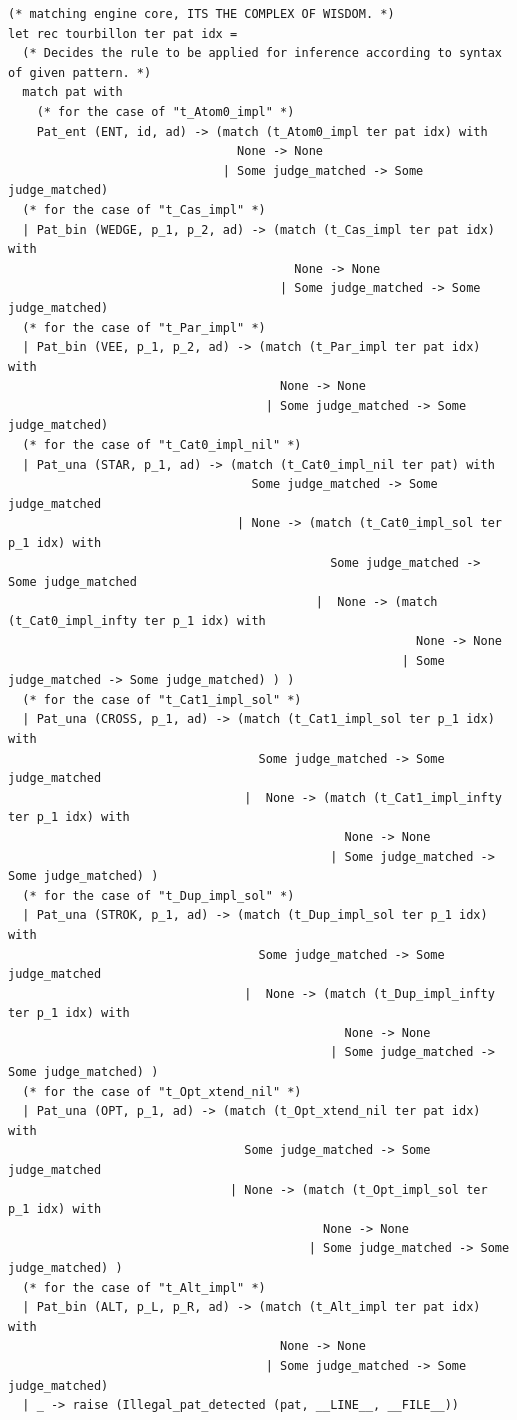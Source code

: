 \documentclass[12pt]{article}
\begin{document}
\begin{tiny}
\begin{verbatim}
(* matching engine core, ITS THE COMPLEX OF WISDOM. *)
let rec tourbillon ter pat idx =
  (* Decides the rule to be applied for inference according to syntax of given pattern. *)
  match pat with
    (* for the case of "t_Atom0_impl" *)
    Pat_ent (ENT, id, ad) -> (match (t_Atom0_impl ter pat idx) with
                                None -> None
                              | Some judge_matched -> Some judge_matched)
  (* for the case of "t_Cas_impl" *)
  | Pat_bin (WEDGE, p_1, p_2, ad) -> (match (t_Cas_impl ter pat idx) with
                                        None -> None
                                      | Some judge_matched -> Some judge_matched)
  (* for the case of "t_Par_impl" *)
  | Pat_bin (VEE, p_1, p_2, ad) -> (match (t_Par_impl ter pat idx) with
                                      None -> None
                                    | Some judge_matched -> Some judge_matched)
  (* for the case of "t_Cat0_impl_nil" *)
  | Pat_una (STAR, p_1, ad) -> (match (t_Cat0_impl_nil ter pat) with
                                  Some judge_matched -> Some judge_matched
                                | None -> (match (t_Cat0_impl_sol ter p_1 idx) with
                                             Some judge_matched -> Some judge_matched
                                           |  None -> (match (t_Cat0_impl_infty ter p_1 idx) with
                                                         None -> None
                                                       | Some judge_matched -> Some judge_matched) ) )
  (* for the case of "t_Cat1_impl_sol" *)
  | Pat_una (CROSS, p_1, ad) -> (match (t_Cat1_impl_sol ter p_1 idx) with
                                   Some judge_matched -> Some judge_matched
                                 |  None -> (match (t_Cat1_impl_infty ter p_1 idx) with
                                               None -> None
                                             | Some judge_matched -> Some judge_matched) )
  (* for the case of "t_Dup_impl_sol" *)
  | Pat_una (STROK, p_1, ad) -> (match (t_Dup_impl_sol ter p_1 idx) with
                                   Some judge_matched -> Some judge_matched
                                 |  None -> (match (t_Dup_impl_infty ter p_1 idx) with
                                               None -> None
                                             | Some judge_matched -> Some judge_matched) )
  (* for the case of "t_Opt_xtend_nil" *)
  | Pat_una (OPT, p_1, ad) -> (match (t_Opt_xtend_nil ter pat idx) with
                                 Some judge_matched -> Some judge_matched
                               | None -> (match (t_Opt_impl_sol ter p_1 idx) with
                                            None -> None
                                          | Some judge_matched -> Some judge_matched) )
  (* for the case of "t_Alt_impl" *)
  | Pat_bin (ALT, p_L, p_R, ad) -> (match (t_Alt_impl ter pat idx) with
                                      None -> None
                                    | Some judge_matched -> Some judge_matched)
  | _ -> raise (Illegal_pat_detected (pat, __LINE__, __FILE__))



\end{verbatim}
\end{tiny}
\end{document}
